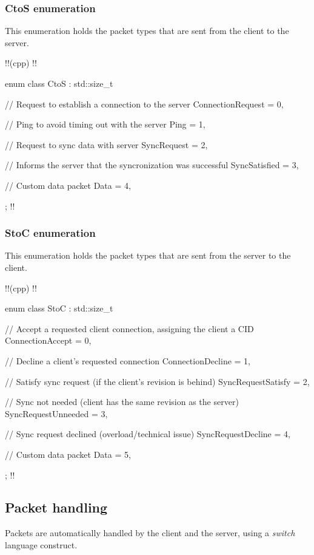 \documentclass{report}
\begin{document}
                \subsubsection{CtoS enumeration}
                    This enumeration holds the packet types that are sent from the client to the server.

                    !!(cpp)
                    !!{
    enum class CtoS : std::size_t
    {
        // Request to establish a connection to the server
        ConnectionRequest = 0,      
        
        // Ping to avoid timing out with the server
        Ping = 1,                   

        // Request to sync data with server
        SyncRequest = 2,            
        
        // Informs the server that the syncronization was successful
        SyncSatisfied = 3,         

        // Custom data packet
        Data = 4,                   
    };
                    !!}

                \subsubsection{StoC enumeration}
                    This enumeration holds the packet types that are sent from the server to the client.

                    !!(cpp)
                    !!{
    enum class StoC : std::size_t
    {
        // Accept a requested client connection, assigning the client a CID
        ConnectionAccept = 0,       
        
        // Decline a client's requested connection
        ConnectionDecline = 1,      

        // Satisfy sync request (if the client's revision is behind)
        SyncRequestSatisfy = 2,     

        // Sync not needed (client has the same revision as the server)
        SyncRequestUnneeded = 3,    

        // Sync request declined (overload/technical issue)
        SyncRequestDecline = 4,     

        // Custom data packet
        Data = 5,                   
    };
                    !!}
            
            \subsection{Packet handling}
                Packets are automatically handled by the client and the server, using a \emph{switch} language construct.
\end{document}
